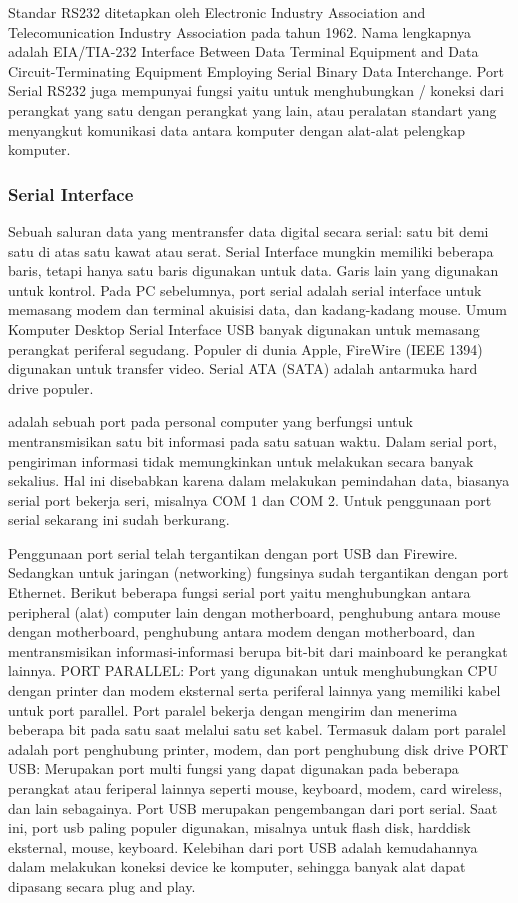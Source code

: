 \begin{itemize}
Standar RS232 ditetapkan oleh Electronic Industry Association and Telecomunication Industry Association pada tahun 1962. Nama lengkapnya adalah EIA/TIA-232 Interface Between Data Terminal Equipment and Data Circuit-Terminating Equipment Employing Serial Binary Data Interchange.
Port Serial RS232 juga mempunyai fungsi yaitu untuk menghubungkan / koneksi dari perangkat yang satu dengan perangkat yang lain, atau peralatan standart yang menyangkut komunikasi data antara komputer dengan alat-alat pelengkap komputer.

\subsubsection{Serial Interface}
Sebuah saluran data yang mentransfer data digital secara serial: satu bit demi satu di atas satu kawat atau serat. Serial Interface mungkin memiliki beberapa baris, tetapi hanya satu baris digunakan untuk data. Garis lain yang digunakan untuk kontrol.
Pada PC sebelumnya, port serial adalah serial interface untuk memasang modem dan terminal akuisisi data, dan kadang-kadang mouse.
Umum Komputer Desktop Serial Interface
USB banyak digunakan untuk memasang perangkat periferal segudang. Populer di dunia Apple, FireWire (IEEE 1394) digunakan untuk transfer video. Serial ATA (SATA) adalah antarmuka hard drive populer.

adalah sebuah port pada personal computer yang berfungsi untuk mentransmisikan satu bit informasi pada satu satuan waktu. Dalam serial port, pengiriman informasi tidak memungkinkan untuk melakukan secara banyak sekalius. Hal ini disebabkan karena dalam melakukan pemindahan data, biasanya serial port bekerja seri, misalnya COM 1 dan COM 2. Untuk penggunaan port serial sekarang ini sudah berkurang. 

Penggunaan port serial telah tergantikan dengan port USB dan Firewire. Sedangkan untuk jaringan (networking) fungsinya sudah tergantikan dengan port Ethernet. Berikut beberapa fungsi serial port yaitu menghubungkan antara peripheral (alat) computer lain dengan motherboard, penghubung antara mouse dengan motherboard, penghubung antara modem dengan motherboard, dan mentransmisikan informasi-informasi berupa bit-bit dari mainboard ke perangkat lainnya.
PORT PARALLEL: Port yang digunakan untuk menghubungkan CPU dengan printer dan modem eksternal serta periferal lainnya yang memiliki kabel untuk port parallel. Port paralel bekerja dengan mengirim dan menerima beberapa bit pada satu saat melalui satu set kabel. Termasuk dalam port paralel adalah port penghubung printer, modem, dan port penghubung disk drive
PORT USB: Merupakan port multi fungsi yang dapat digunakan pada beberapa perangkat atau feriperal lainnya seperti mouse, keyboard, modem, card wireless, dan lain sebagainya. Port USB merupakan pengembangan dari port serial. Saat ini, port usb paling populer digunakan, misalnya untuk flash disk, harddisk eksternal, mouse, keyboard. Kelebihan dari port USB adalah kemudahannya dalam melakukan koneksi device ke komputer, sehingga banyak alat dapat dipasang secara plug and play. 


\end{itemize}
